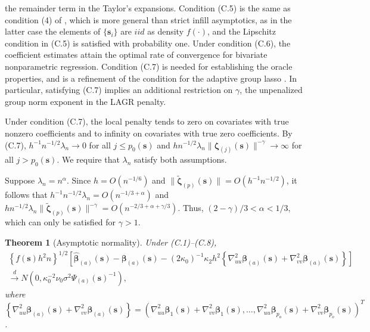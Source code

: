 \documentclass[authoryear,review, 12pt]{elsarticle}
\newtheorem{thm}{Theorem}
\begin{document}
the remainder term in the Taylor's expansions. Condition (C.5) is
the same as condition (4) of \citet{Sun-Yan-Zhang-Lu-2014}, which
is more general than strict infill asymptotics, as in the latter case
the elements of $\{\bm{s}_{i}\}$ are $iid$ as density $f(\cdot)$,
and the Lipschitz condition in (C.5) is satisfied with probability
one. Under condition (C.6), the coefficient estimates attain the optimal
rate of convergence for bivariate nonparametric regression. Condition
(C.7) is needed for establishing the oracle properties, and is a refinement
of the condition for the adaptive group lasso \citep{Wang-Leng-2008}.
In particular, satisfying (C.7) implies an additional restriction
on $\gamma$, the unpenalized group norm exponent in the LAGR penalty.

Under condition (C.7), the local penalty tends to zero on covariates
with true nonzero coefficients and to infinity on covariates with
true zero coefficients. By (C.7), $h^{-1}n^{-1/2}\lambda_{n}\to0$
for all $j\le p_{0}(\bm{s})$ and $hn^{-1/2}\lambda_{n}\|\bm{\zeta}_{(j)}(\bm{s})\|^{-\gamma}\to\infty$
for all $j>p_{0}(\bm{s})$. We require that $\lambda_{n}$ satisfy both assumptions.

Suppose $\lambda_{n}=n^{\alpha}$. Since $h=O\left(n^{-1/6}\right)$
and $\|\tilde{\bm{\zeta}}_{(p)}(\bm{s})\|=O\left(h^{-1}n^{-1/2}\right)$,
it follows that $h^{-1}n^{-1/2}\lambda_{n}=O\left(n^{-1/3+\alpha}\right)$
and $hn^{-1/2}\lambda_{n}\|\tilde{\bm{\zeta}}_{(p)}(\bm{s})\|^{-\gamma}=O\left(n^{-2/3+\alpha+\gamma/3}\right)$.
Thus, $\left(2-\gamma\right)/3<\alpha<1/3$, which can only be satisfied
for $\gamma>1$.
\begin{thm}[Asymptotic normality]
\label{theorem:normality}  Under (C.1)--(C.8),
\begin{gather*}
\left\{ f(\bm{s})h^{2}n\right\} ^{1/2}\left[\hat{\bm{\beta}}_{(a)}(\bm{s})-\bm{\beta}_{(a)}(\bm{s})-(2\kappa_{0})^{-1}\kappa_{2}h^{2}\left\{ \nabla_{uu}^{2}\bm{\beta}_{(a)}(\bm{s})+\nabla_{vv}^{2}\bm{\beta}_{(a)}(\bm{s})\right\} \right]\\
\xrightarrow{d}N\left(0,\kappa_{0}^{-2}\nu_{0}\sigma^{2}\Psi_{(a)}(\bm{s})^{-1}\right),
\end{gather*}
where $\left\{ \nabla_{uu}^{2}\bm{\beta}_{(a)}(\bm{s})+\nabla_{vv}^{2}\bm{\beta}_{(a)}(\bm{s})\right\} =\left(\nabla_{uu}^{2}\bm{\beta}_{1}(\bm{s})+\nabla_{vv}^{2}\bm{\beta}_{1}(\bm{s}),\dots,\nabla_{uu}^{2}\bm{\beta}_{p_{o}}(\bm{s})+\nabla_{vv}^{2}\bm{\beta}_{p_{o}}(\bm{s})\right)^{T}$.
\end{thm}
\end{document}
